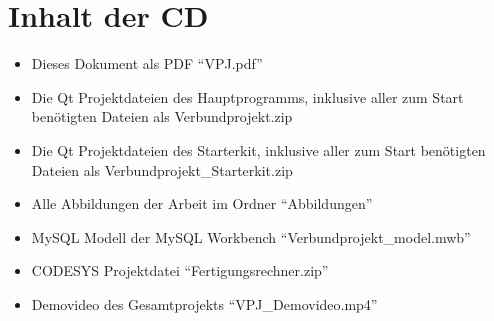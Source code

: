
\chapter{Inhalt der CD}
\begin{itemize}
    \item Dieses Dokument als PDF "`VPJ.pdf"' \\

    \item Die Qt Projektdateien des Hauptprogramms, inklusive aller zum Start benötigten Dateien als Verbundprojekt.zip \\

    \item Die Qt Projektdateien des Starterkit, inklusive aller zum Start benötigten Dateien als Verbundprojekt\_Starterkit.zip \\
		
    \item Alle Abbildungen der Arbeit im Ordner "`Abbildungen"' \\
		
		\item MySQL Modell der MySQL Workbench "`Verbundprojekt\_model.mwb"' \\ 

		\item CODESYS Projektdatei "`Fertigungsrechner.zip"' \\
		
		\item Demovideo des Gesamtprojekts "`VPJ\_Demovideo.mp4"' \\

\end{itemize}
